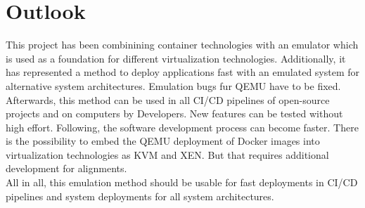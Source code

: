 \chapter{Outlook}\label{ch:outlook}

This project has been combinining container technologies with an emulator which is used as a foundation for different virtualization technologies. 
Additionally, it has represented a method to deploy applications fast with an emulated system for alternative system architectures.
Emulation bugs fur QEMU have to be fixed. Afterwards, this method can be used in all CI/CD pipelines of open-source projects and on computers by Developers.
New features can be tested without high effort. Following, the software development process can become faster.
There is the possibility to embed the QEMU deployment of Docker images into virtualization technologies as KVM and XEN.
But that requires additional development for alignments. \\
All in all, this emulation method should be usable for fast deployments in CI/CD pipelines and system deployments for all system architectures.